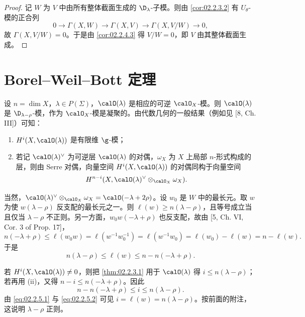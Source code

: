 \begin{proof}
记 $W$ 为 $V$ 中由所有整体截面生成的 $\D_\lambda$-子模。则由 \ref{cor:02.2.3.2} 有 $U_\theta$-模的正合列
\[
0\longrightarrow\Gamma(X,W)\longrightarrow\Gamma(X,V)\longrightarrow\Gamma(X,V/W)\longrightarrow 0,
\]
故 $\Gamma(X,V/W)=0$。于是由 \ref{cor:02.2.4.3} 得 $V/W=0$，即 $V$ 由其整体截面生成。
\end{proof}

\section{Borel--Weil--Bott 定理}
\label{sec:02.2.5}

设 $n=\dim X$，$\lambda\in P(\Sigma)$，$\calO(\lambda)$ 是相应的可逆 $\calO_X$-模。则 $\calO(\lambda)$ 是 $\D_{\lambda-\rho}$-模，作为 $\calO_X$-模是凝聚的。由代数几何的一般结果（例如见 [8, Ch. III]）可知：
\begin{enumerate}[label=(\roman*)]
  \item $H^i(X,\calO(\lambda))$ 是有限维 $\g$-模；
  \item 若记 $\calO(\lambda)^{\vee}$ 为可逆层 $\calO(\lambda)$ 的对偶，$\omega_X$ 为 $X$ 上局部 $n$-形式构成的层，则由 Serre 对偶，向量空间 $H^i(X,\calO(\lambda))$ 的对偶同构于向量空间
\[
H^{n-i}(X,\calO(\lambda)^{\vee}\otimes_{\calO_X}\omega_X).
\]
\end{enumerate}
当然，$\calO(\lambda)^{\vee}\otimes_{\calO_X}\omega_X=\calO(-\lambda+2\rho)$。设 $w_0$ 是 $W$ 中的最长元。取 $w$ 为使 $w(\lambda-\rho)$ 反支配的最长元之一。则 $\ell(w)\ge n(\lambda-\rho)$，且等号成立当且仅当 $\lambda-\rho$ 不正则。另一方面，$w_0w(-\lambda+\rho)$ 也反支配，故由 [5, Ch. VI, Cor. 3 of Prop. 17]，
\[
n(-\lambda+\rho)\le\ell(w_0w)=\ell(w^{-1}w_0^{-1})=\ell(w^{-1}w_0)=\ell(w_0)-\ell(w)=n-\ell(w).
\]
于是
\begin{equation}\label{eq:02.2.5.1}
n(\lambda-\rho)\le\ell(w)\le n-n(-\lambda+\rho).
\end{equation}

若 $H^i(X,\calO(\lambda))\neq0$，则把 \ref{thm:02.2.3.1} 用于 $\calO(\lambda)$ 得 $i\le n(\lambda-\rho)$；若再用 (ii)，又得 $n-i\le n(-\lambda+\rho)$。因此
\begin{equation}\label{eq:02.2.5.2}
n-n(-\lambda+\rho)\le i\le n(\lambda-\rho).
\end{equation}
由 \eqref{eq:02.2.5.1} 与 \eqref{eq:02.2.5.2} 可见 $i=\ell(w)=n(\lambda-\rho)$。按前面的附注，这说明 $\lambda-\rho$ 正则。

